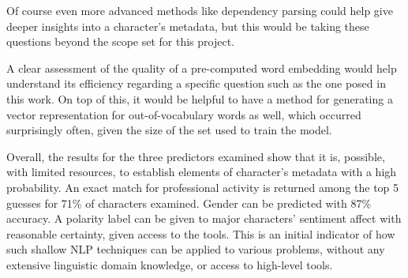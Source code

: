 Of course even more advanced methods like dependency parsing could help give deeper insights into a character's metadata, but this would be taking these questions beyond the scope set for this project.

A clear assessment of the quality of a pre-computed word embedding would help understand its efficiency regarding a specific question such as the one posed in this work. On top of this, it would be helpful to have a method for generating a vector representation for out-of-vocabulary words as well, which occurred surprisingly often, given the size of the set used to train the model.

Overall, the results for the three predictors examined show that it is, possible, with limited resources, to establish elements of character's metadata with a high probability. An exact match for professional activity is returned among the top 5 guesses for 71\% of characters examined. Gender can be predicted with 87\% accuracy. A polarity label can be given to major characters' sentiment affect with reasonable certainty, given access to the tools. This is an initial indicator of how such shallow NLP techniques can be applied to various problems, without any extensive linguistic domain knowledge, or access to high-level tools.